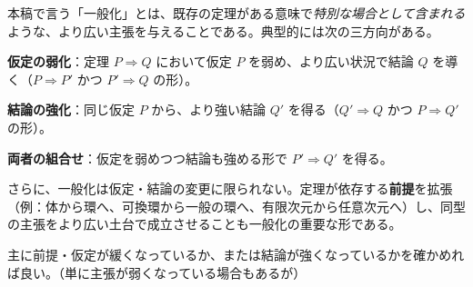 \documentclass[a4paper,12pt]{bxjsbook}
\newlength{\customindent}
\newenvironment{body}{
  \par
  \begingroup
  \setlength{\leftskip}{\customindent}
  \setlength{\rightskip}{0pt}
  \setlength{\parindent}{1em}
  \setlength{\displayindent}{\customindent}
  \setlength{\displaywidth}{\dimexpr\linewidth-\customindent\relax}
}{
  \par
  \endgroup
}
\theoremstyle{theorem}
\begin{document}
    \begin{body}

        
        
        \indent 本稿で言う「一般化」とは、既存の定理がある意味で\emph{特別な場合として含まれる}ような、より広い主張を与えることである。典型的には次の三方向がある。
        \begin{bodyitemize}[leftmargin=3.5em]
            \item \textbf{仮定の弱化}：定理 $P⇒Q$ において仮定 $P$ を弱め、より広い状況で結論 $Q$ を導く（$P \Rightarrow P'$ かつ $P'⇒Q$ の形）。
            \item \textbf{結論の強化}：同じ仮定 $P$ から、より強い結論 $Q'$ を得る（$Q' \Rightarrow Q$ かつ $P⇒Q'$ の形）。
            \item \textbf{両者の組合せ}：仮定を弱めつつ結論も強める形で $P'⇒Q'$ を得る。
        \end{bodyitemize}
        
        \indent さらに、一般化は仮定・結論の変更に限られない。定理が依存する\textbf{前提}を拡張（例：体から環へ、可換環から一般の環へ、有限次元から任意次元へ）し、同型の主張をより広い土台で成立させることも一般化の重要な形である。

        \indent 主に前提・仮定が緩くなっているか、または結論が強くなっているかを確かめれば良い。（単に主張が弱くなっている場合もあるが）



    \end{body}
\end{document}
